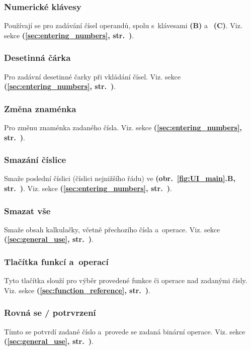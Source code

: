 \documentclass[a5paper,8pt,twoside]{extarticle}
\newcommand*\nref[1]{\textbf{(\ref{#1}, str.~\pageref{#1})}}
\newcommand*\fref[2]{\textbf{(obr.~\ref{#1}#2, str.~\pageref{#1})}}
\begin{document}
    \subsubsection{Numerické klávesy}
    Používají se pro zadávání čísel operandů, spolu s~klávesami  \textbf{(B)} a~ \textbf{(C)}. Viz. sekce  \nref{sec:entering_numbers}.

    \subsubsection{Desetinná čárka}
    Pro zadávní desetinné čarky při vkládání čísel. Viz. sekce  \nref{sec:entering_numbers}.

    \subsubsection{Změna znaménka}
    Pro změnu znaménka zadaného čísla. Viz. sekce  \nref{sec:entering_numbers}.

    \subsubsection{Smazání číslice}
    Smaže poslední číslici (číslici nejnižšího řádu) ve  \fref{fig:UI_main}{.B}. Viz. sekce  \nref{sec:entering_numbers}.

    \subsubsection{Smazat vše}
    Smaže obsah kalkulačky, včetně přechozího čísla a~operace. Viz. sekce  \nref{sec:general_use}.

    \subsubsection{Tlačítka funkcí a~operací}
    Tyto tlačítka slouží pro výběr provedené funkce či operace nad zadanými čísly. Viz. sekce  \nref{sec:function_reference}.

    \subsubsection{Rovná se / potrvrzení}
    Tímto se potvrdí zadané číslo a~provede se zadaná binární operace. Viz. sekce  \nref{sec:general_use}.
\end{document}
